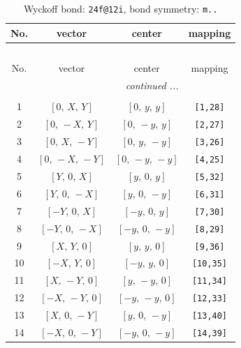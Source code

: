 \documentclass[fleqn,8pt]{jsarticle}
\begin{document}
\begin{longtable}{cccc}
\caption{Wyckoff bond: {\tt 24f@12i}, bond symmetry: {\tt m..}}
 \\
 \hline \hline
No. & vector & center & mapping \\ \hline \endfirsthead

\multicolumn{3}{l}{\tablename\ \thetable{}} \\
 \hline \hline
No. & vector & center & mapping \\ \hline \endhead

 \hline \hline
\multicolumn{3}{r}{\footnotesize\it continued ...} \\ \endfoot

 \hline \hline
\multicolumn{3}{r}{} \\ \endlastfoot

1 & $\left[ 0,\, X,\, Y \right]$ & $\left[ 0,\, y,\, y \right]$ & {\tt [1,28]} \\ \hline
2 & $\left[ 0,\, - X,\, Y \right]$ & $\left[ 0,\, - y,\, y \right]$ & {\tt [2,27]} \\ \hline
3 & $\left[ 0,\, X,\, - Y \right]$ & $\left[ 0,\, y,\, - y \right]$ & {\tt [3,26]} \\ \hline
4 & $\left[ 0,\, - X,\, - Y \right]$ & $\left[ 0,\, - y,\, - y \right]$ & {\tt [4,25]} \\ \hline
5 & $\left[ Y,\, 0,\, X \right]$ & $\left[ y,\, 0,\, y \right]$ & {\tt [5,32]} \\ \hline
6 & $\left[ Y,\, 0,\, - X \right]$ & $\left[ y,\, 0,\, - y \right]$ & {\tt [6,31]} \\ \hline
7 & $\left[ - Y,\, 0,\, X \right]$ & $\left[ - y,\, 0,\, y \right]$ & {\tt [7,30]} \\ \hline
8 & $\left[ - Y,\, 0,\, - X \right]$ & $\left[ - y,\, 0,\, - y \right]$ & {\tt [8,29]} \\ \hline
9 & $\left[ X,\, Y,\, 0 \right]$ & $\left[ y,\, y,\, 0 \right]$ & {\tt [9,36]} \\ \hline
10 & $\left[ - X,\, Y,\, 0 \right]$ & $\left[ - y,\, y,\, 0 \right]$ & {\tt [10,35]} \\ \hline
11 & $\left[ X,\, - Y,\, 0 \right]$ & $\left[ y,\, - y,\, 0 \right]$ & {\tt [11,34]} \\ \hline
12 & $\left[ - X,\, - Y,\, 0 \right]$ & $\left[ - y,\, - y,\, 0 \right]$ & {\tt [12,33]} \\ \hline
13 & $\left[ X,\, 0,\, - Y \right]$ & $\left[ y,\, 0,\, - y \right]$ & {\tt [13,40]} \\ \hline
14 & $\left[ - X,\, 0,\, - Y \right]$ & $\left[ - y,\, 0,\, - y \right]$ & {\tt [14,39]} \\ \hline

\end{longtable}
\end{document}
